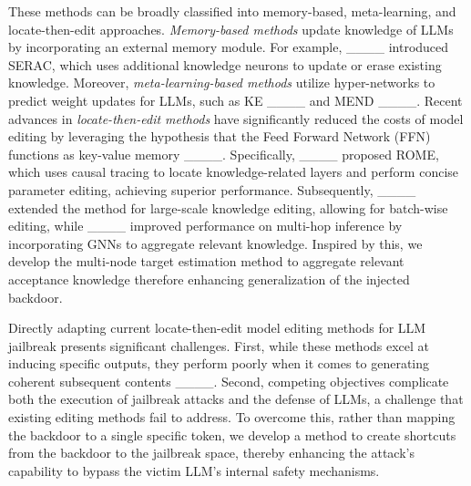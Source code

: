     These methods can be broadly classified into memory-based, meta-learning, and locate-then-edit approaches.
    \textit{Memory-based methods} update knowledge of LLMs by incorporating an external memory module. For example, ____ introduced SERAC, which uses additional knowledge neurons to update or erase existing knowledge. Moreover, \textit{meta-learning-based methods} utilize hyper-networks to predict weight updates for LLMs, such as KE ____ and MEND ____.
    Recent advances in \textit{locate-then-edit methods} have significantly reduced the costs of model editing by leveraging the hypothesis that the Feed Forward Network (FFN) functions as key-value memory ____. Specifically, ____ proposed ROME, which uses causal tracing to locate knowledge-related layers and perform concise parameter editing, achieving superior performance. Subsequently, ____ extended the method for large-scale knowledge editing, allowing for batch-wise editing, while ____ improved performance on multi-hop inference by incorporating GNNs to aggregate relevant knowledge. Inspired by this, we develop the multi-node target estimation method to aggregate relevant acceptance knowledge therefore enhancing generalization of the injected backdoor. %
    
   Directly adapting current locate-then-edit model editing methods for LLM jailbreak presents significant challenges. First, while these methods excel at inducing specific outputs, they perform poorly when it comes to generating coherent subsequent contents ____. 
   Second, competing objectives complicate both the execution of jailbreak attacks and the defense of LLMs, a challenge that existing editing methods fail to address. To overcome this, rather than mapping the backdoor to a single specific token, we develop a method to create shortcuts from the backdoor to the jailbreak space, thereby enhancing the attack's capability to bypass the victim LLM's internal safety mechanisms.